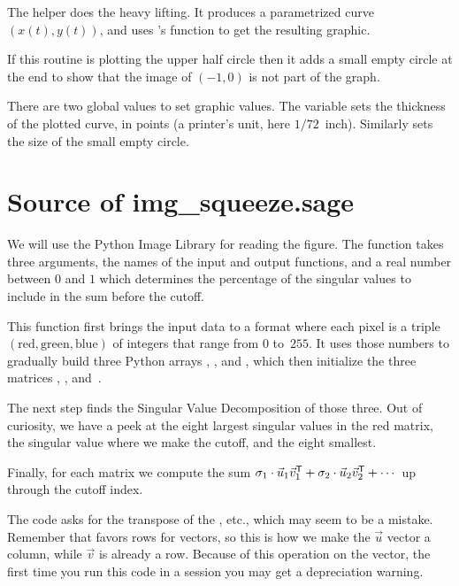 The helper does the heavy lifting.
It produces a parametrized curve $(x(t),y(t))$, and uses \Sage's
 function to get the resulting graphic.

If this routine is plotting the upper half circle then it adds a
small empty circle at the end to show that the image of $(-1,0)$
is not part of the graph.

There are two global values to set graphic values.
The variable  sets the thickness of 
the plotted curve, in points (a printer's unit, here $1/72$~inch).
Similarly  sets the size of the small empty circle.



\section{Source of img\_squeeze.sage}
We will use the Python Image Library for reading the figure.
The function
takes three arguments, the names of the input and output functions, and
a real number between $0$ and $1$ which determines the percentage 
of the singular values to include in the sum before the cutoff.


This function first brings the input data to a format where each
pixel is a triple 
$(\text{red}, \text{green},\text{blue})$ of integers that range from 
$0$ to~$255$.
It uses those numbers to gradually build 
three Python arrays , ,
and , which then initialize the 
three \Sage{} matrices ,
, and~.


The next step finds the Singular Value Decomposition of those three.
Out of curiosity, we have a peek at the eight largest singular
values in the red matrix, the singular value where we make the cutoff,
and the eight smallest.


Finally, for each matrix we compute the sum
$\sigma_1\cdot\vec{u}_1{{\vec{v}}^{\mathsf{T}}}_1+\sigma_2\cdot\vec{u}_2{{\vec{v}}^{\mathsf{T}}}_2
   +\cdots$
up through the cutoff index.

The code asks for the transpose of the
\protect{}, etc., which may seem to be a mistake.
Remember that \protect\Sage{} favors rows for vectors, so this is how we
make the $\vec{u}$ vector a column, while $\vec{v}$ is already a row.
Because of this operation on the vector, the first time you run this
code in a \protect\Sage{} session you may get a depreciation warning.

